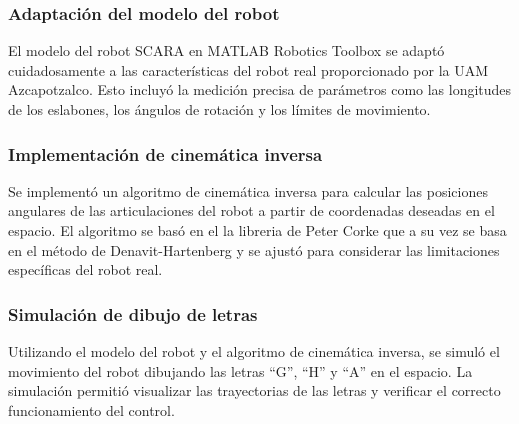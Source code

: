 \documentclass[final]{foresj}
\begin{document}
\subsubsection{Adaptación del modelo del robot}

El modelo del robot SCARA en MATLAB Robotics Toolbox se adaptó cuidadosamente a las características del robot real proporcionado por la UAM Azcapotzalco. Esto incluyó la medición precisa de parámetros como las longitudes de los eslabones, los ángulos de rotación y los límites de movimiento.

\subsubsection{Implementación de cinemática inversa}
Se implementó un algoritmo de cinemática inversa para calcular las posiciones angulares de las articulaciones del robot a partir de coordenadas deseadas en el espacio. El algoritmo se basó en el la libreria de Peter Corke que a su vez se basa en el método de Denavit-Hartenberg y se ajustó para considerar las limitaciones específicas del robot real.

\subsubsection{Simulación de dibujo de letras}
Utilizando el modelo del robot y el algoritmo de cinemática inversa, se simuló el movimiento del robot dibujando las letras ``G'', ``H'' y ``A'' en el espacio. La simulación permitió visualizar las trayectorias de las letras y verificar el correcto funcionamiento del control.
\end{document}
